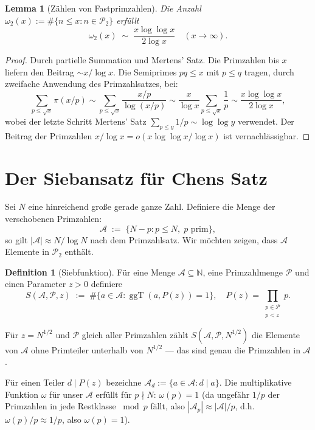 \documentclass[12pt,a4paper]{amsart}
\newtheorem{lemma}[theorem]{Lemma}
\theoremstyle{definition}
\newtheorem{definition}[theorem]{Definition}
\newcommand{\N}{\mathbb{N}}
\DeclareMathOperator{\ggT}{ggT}
\newcommand{\Ptwo}{\mathcal{P}_2}
\begin{document}
\begin{lemma}[Zählen von Fastprimzahlen]\label{lem:zaehlen_p2}
  Die Anzahl $\omega_2(x) := \#\{n \leq x : n \in \Ptwo\}$ erfüllt
  \[
    \omega_2(x) \;\sim\; \frac{x\log\log x}{2\log x}
    \quad (x \to \infty).
  \]
\end{lemma}

\begin{proof}
  Durch partielle Summation und Mertens' Satz.  Die Primzahlen bis $x$
  liefern den Beitrag $\sim x/\log x$.  Die Semiprimes $pq \leq x$ mit
  $p \leq q$ tragen, durch zweifache Anwendung des Primzahlsatzes, bei:
  \[
    \sum_{p \leq \sqrt{x}}\pi(x/p)
    \sim \sum_{p \leq \sqrt{x}}\frac{x/p}{\log(x/p)}
    \sim \frac{x}{\log x}\sum_{p \leq \sqrt{x}}\frac{1}{p}
    \sim \frac{x\log\log x}{2\log x},
  \]
  wobei der letzte Schritt Mertens' Satz $\sum_{p \leq y}1/p \sim \log\log y$
  verwendet.  Der Beitrag der Primzahlen $x/\log x = o(x\log\log x/\log x)$
  ist vernachlässigbar.
\end{proof}

\section{Der Siebansatz für Chens Satz}

Sei $N$ eine hinreichend große gerade ganze Zahl.  Definiere die Menge der
verschobenen Primzahlen:
\[
  \mathcal{A} \;:=\; \{N - p : p \leq N,\; p \text{ prim}\},
\]
so gilt $|\mathcal{A}| \approx N/\log N$ nach dem Primzahlsatz.
Wir möchten zeigen, dass $\mathcal{A}$ Elemente in $\Ptwo$ enthält.

\begin{definition}[Siebfunktion]
  Für eine Menge $\mathcal{A} \subseteq \N$, eine Primzahlmenge $\mathcal{P}$
  und einen Parameter $z > 0$ definiere
  \[
    S(\mathcal{A}, \mathcal{P}, z)
    \;:=\;
    \#\bigl\{a \in \mathcal{A} : \ggT(a, P(z)) = 1\bigr\},
    \quad P(z) = \prod_{\substack{p \in \mathcal{P} \\ p < z}} p.
  \]
\end{definition}

Für $z = N^{1/2}$ und $\mathcal{P}$ gleich aller Primzahlen zählt
$S(\mathcal{A}, \mathcal{P}, N^{1/2})$ die Elemente von $\mathcal{A}$
ohne Primteiler unterhalb von $N^{1/2}$ --- das sind genau die Primzahlen
in $\mathcal{A}$.

Für einen Teiler $d \mid P(z)$ bezeichne $\mathcal{A}_d := \{a \in \mathcal{A} : d \mid a\}$.
Die multiplikative Funktion $\omega$ für unser $\mathcal{A}$ erfüllt für
$p \nmid N$: $\omega(p) = 1$ (da ungefähr $1/p$ der Primzahlen in jede
Restklasse $\bmod p$ fällt, also $|\mathcal{A}_p| \approx |\mathcal{A}|/p$,
d.h. $\omega(p)/p \approx 1/p$, also $\omega(p) = 1$).
\end{document}

